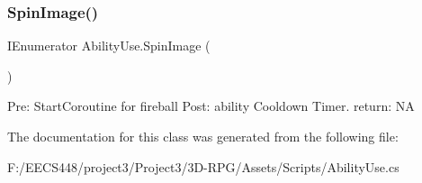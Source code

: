 \subsubsection{\texorpdfstring{Spin\+Image()}{SpinImage()}}
{\footnotesize\ttfamily I\+Enumerator Ability\+Use.\+Spin\+Image (\begin{DoxyParamCaption}{ }\end{DoxyParamCaption})\hspace{0.3cm}{\ttfamily [private]}}

Pre\+: Start\+Coroutine for fireball Post\+: ability Cooldown Timer. return\+: NA 

The documentation for this class was generated from the following file\+:\begin{DoxyCompactItemize}
\item 
F\+:/\+E\+E\+C\+S448/project3/\+Project3/3\+D-\/\+R\+P\+G/\+Assets/\+Scripts/Ability\+Use.\+cs\end{DoxyCompactItemize}
